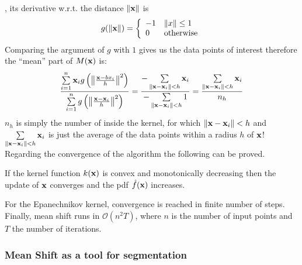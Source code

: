 \documentclass[a4paper]{article}
\begin{document}
, its derivative w.r.t. the distance $\left\lVert\textbf{x}\right\rVert$ is
\[
g(\left\lVert\textbf{x}\right\rVert) = \left\{
\begin{array}{ll}
      -1 & \left\lVert x\right\rVert \leq 1 \\
      0 & \textrm{otherwise}\\
\end{array} 
\right. 
\]
Comparing the argument of $g$ with $1$ gives us the data points of interest therefore the ``mean'' part of $M(\textbf{x})$ is:
\begin{align}
 \frac{\sum \limits_{i=1}^{n}{\bx_i g\left(\norm{\frac{\bx - bx_i}{h}}^2 \right)}}%
{\sum\limits_{i=1}^{n}{g\left(\norm{\frac{\bx - \bx_i}{h}}^2 \right)}}= \frac{-\sum\limits_{\norm{\bx - \bx_i} < h}{\bx_i}} {-\sum\limits_{\norm{\bx - \bx_i} < h}1}=
\frac{\sum\limits_{\norm{\bx - \bx_i} < h}{\bx_i}}{n_h}
\label{eq:mean_shift_mean_upd}
\end{align}
$n_h$ is simply the number of inside the kernel, for which $\left\lVert\textbf{x} - \textbf{x}_i\right\rVert < h$ and $\sum\limits_{\left\lVert\textbf{x} - \textbf{x}_i\right\rVert < h}{\textbf{x}_i}$ is just the average of the data points within a radius $h$ of $\textbf{x}$! Regarding the convergence of the algorithm the following can be proved.
\begin{theorem}
If the kernel function $k(\textbf{x})$ is convex and monotonically decreasing then the update of $\textbf{x}$ converges and the pdf $\hat{f}(\textbf{x})$ increases.
\end{theorem}
For the Epanechnikov kernel, convergence is reached in finite number of steps. Finally, mean shift runs in $\mathcal{O}(n^2T)$, where $n$ is the number of input points and $T$ the number of iterations.










\subsubsection{Mean Shift as a tool for segmentation}
\end{document}
